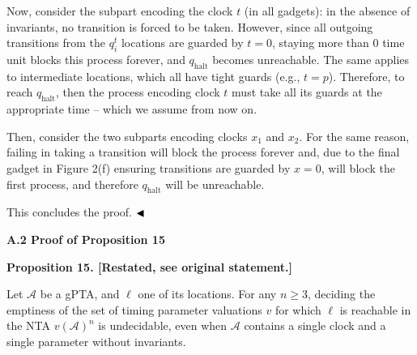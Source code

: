  
 
Now, consider the subpart encoding the clock $t$ (in all gadgets): in the absence of invariants, no transition is forced to be taken. However, since all outgoing transitions from the $q_{i}^{t}$ locations are guarded by $t=0$, staying more than 0 time unit blocks this process forever, and $q_{\textrm{halt}}$ becomes unreachable. The same applies to intermediate locations, which all have tight guards (e.g., $t=p$). Therefore, to reach $q_{\textrm{halt}}$, then the process encoding clock $t$ must take all its guards at the appropriate time -- which we assume from now on.\par
 
 
 
Then, consider the two subparts encoding clocks $x_{1}$ and $x_{2}$. For the same reason, failing in taking a transition will block the process forever and, due to the final gadget in Figure 2(f) ensuring transitions are guarded by $x=0$, will block the first process, and therefore $q_{\textrm{halt}}$ will be unreachable.\par
 
 
 
This concludes the proof. $\hfill\blacktriangleleft$\par
 
 
 
 
 
\par\medskip\noindent\textbf{A.2 Proof of Proposition 15}\par
 
 
 
\par\medskip\noindent\textbf{Proposition 15. [Restated, see original statement.]}\par
 
 
Let $\mathcal{A}$ be a gPTA, and $\mathrm{\ell}$ one of its locations. For any $n\geq 3$, deciding the emptiness of the set of timing parameter valuations $v$ for which $\mathrm{\ell}$ is reachable in the NTA ${v(\mathcal{A})}^{n}$ is undecidable, even when $\mathcal{A}$ contains a single clock and a single parameter without invariants.\par
 
